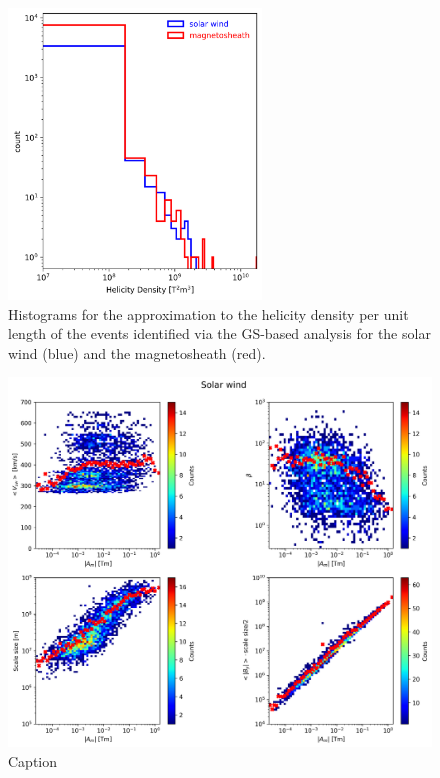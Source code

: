 \begin{figure}
    \centering
    \includegraphics[width=0.6\textwidth]{Figures/Histograms/histogram_helicitydensity.png}
    \caption[Histograms for the approximation to the helicity density per unit length]{Histograms for the approximation to the helicity density per unit length of the events identified via the GS-based analysis for the solar wind (blue) and the magnetosheath (red).}
    \label{fig:histogram-helicitydensity}
\end{figure}

\begin{figure}
    \centering
    \includegraphics[width=\textwidth]{Figures/GS analysis/heatmap_solarwind.png}
    \caption[2D distributions of various parameters vs. $|A_m|$ in the solar wind]{Caption}
    \label{fig:heatmap-solarwind}
\end{figure}

